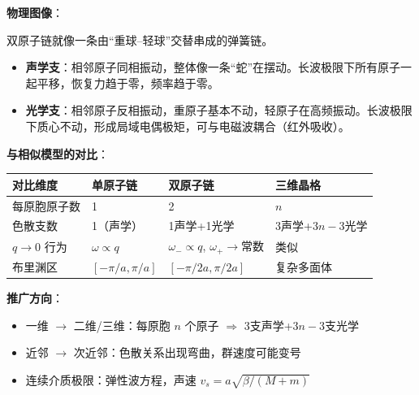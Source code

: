 \begin{insightbox}[物理图像与模型关联]
\textbf{物理图像}：

双原子链就像一条由``重球--轻球''交替串成的弹簧链。
\begin{itemize}[nosep]
    \item \textbf{声学支}：相邻原子同相振动，整体像一条``蛇''在摆动。长波极限下所有原子一起平移，恢复力趋于零，频率趋于零。
    \item \textbf{光学支}：相邻原子反相振动，重原子基本不动，轻原子在高频振动。长波极限下质心不动，形成局域电偶极矩，可与电磁波耦合（红外吸收）。
\end{itemize}

\textbf{与相似模型的对比}：
\begin{center}
\begin{tabular}{llll}
\toprule
\textbf{对比维度} & \textbf{单原子链} & \textbf{双原子链} & \textbf{三维晶格} \\
\midrule
每原胞原子数 & 1 & 2 & $n$ \\
色散支数 & 1（声学） & 1声学+1光学 & 3声学+$3n-3$光学 \\
$q\to0$ 行为 & $\omega\propto q$ & $\omega_{-}\propto q$, $\omega_{+}\to$常数 & 类似 \\
布里渊区 & $[-\pi/a,\pi/a]$ & $[-\pi/2a,\pi/2a]$ & 复杂多面体 \\
\bottomrule
\end{tabular}
\end{center}

\textbf{推广方向}：
\begin{itemize}[nosep]
    \item 一维 $\to$ 二维/三维：每原胞 $n$ 个原子 $\Rightarrow$ 3支声学+$3n-3$支光学
    \item 近邻 $\to$ 次近邻：色散关系出现弯曲，群速度可能变号
    \item 连续介质极限：弹性波方程，声速 $v_s=a\sqrt{\beta/(M+m)}$
\end{itemize}
\end{insightbox}

